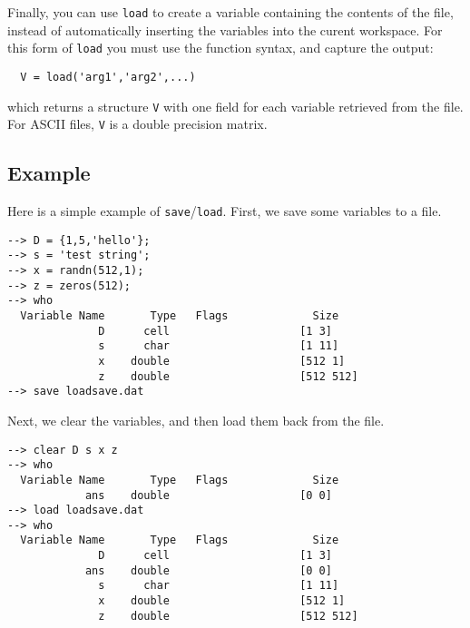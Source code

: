 Finally, you can use \verb|load| to create a variable containing the 
contents of the file, instead of automatically inserting the variables
into the curent workspace.  For this form of \verb|load| you must use the
function syntax, and capture the output:
\begin{verbatim}
  V = load('arg1','arg2',...)
\end{verbatim}
which returns a structure \verb|V| with one field for each variable
retrieved from the file.  For ASCII files, \verb|V| is a double precision
matrix.

\subsection{Example}

Here is a simple example of \verb|save|/\verb|load|.  First, we save some variables to a file.
\begin{verbatim}
--> D = {1,5,'hello'};
--> s = 'test string';
--> x = randn(512,1);
--> z = zeros(512);
--> who
  Variable Name       Type   Flags             Size
              D      cell                    [1 3]
              s      char                    [1 11]
              x    double                    [512 1]
              z    double                    [512 512]
--> save loadsave.dat
\end{verbatim}
Next, we clear the variables, and then load them back from the file.
\begin{verbatim}
--> clear D s x z
--> who
  Variable Name       Type   Flags             Size
            ans    double                    [0 0]
--> load loadsave.dat
--> who
  Variable Name       Type   Flags             Size
              D      cell                    [1 3]
            ans    double                    [0 0]
              s      char                    [1 11]
              x    double                    [512 1]
              z    double                    [512 512]
\end{verbatim}
